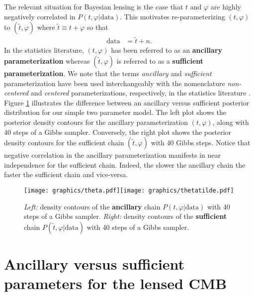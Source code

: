 \documentclass[noinfoline]{imsart}
\begin{document}
The relevant situation for Bayesian lensing is the case that $ t$ and $\varphi$ are highly negatively correlated in $P( t, \varphi|\text{data})$.  This motivates re-parameterizing $( t,\varphi)$ to $(\widetilde  t, \varphi)$ where $\widetilde  t \equiv  t + \varphi$ so that
\begin{align*}
\text{data} &= \widetilde  t + n.
\end{align*}
In the statistics literature,  $( t, \varphi)$ has been referred to as an {\bf ancillary parameterization} whereas $(\widetilde  t, \varphi)$ is referred to as a {\bf sufficient parameterization}.
We note that the terms {\em ancillary} and {\em sufficient } parameterization have been used interchangeably with the nomenclature {\em non-centered} and {\em centered } parameterizations, respectively, in the statistics literature \cite{bernardo2003non,gelfand1995efficient,papaspiliopoulos2008stability,papaspiliopoulos2007general,yu2011center}.  Figure  \ref{fastslowGibbs} illustrates the difference between an ancillary versus sufficient posterior distribution for our simple two parameter model. The left plot shows the posterior density contours for the ancillary parameterization $( t, \varphi)$, along with 40 steps of a Gibbs sampler.  Conversely, the right plot shows the posterior density contours for the sufficient chain $(\widetilde  t, \varphi)$ with 40 Gibbs steps. Notice that negative correlation  in the ancillary parameterization manifests in near independence for the sufficient chain.  Indeed, the slower the ancillary chain the faster the sufficient chain and vice-versa. 
\begin{figure}[H]
\label{fastslowGibbs}
\texttt{[image: graphics/theta.pdf]}\texttt{[image: graphics/thetatilde.pdf]}
\caption{{\em Left:} density contours of the {\bf ancillary} chain $P( t, \varphi|\text{data})$ with 40 steps of a Gibbs sampler. {\em Right:} density contours of the {\bf sufficient}  chain $P(\widetilde  t, \varphi|\text{data})$ with 40 steps of a Gibbs sampler.}
\end{figure}
 







	
%
%
\section{Ancillary versus sufficient parameters for the lensed CMB}
\label{Section: Ancillary and sufficient parameters for the lensed CMB}
\end{document}

